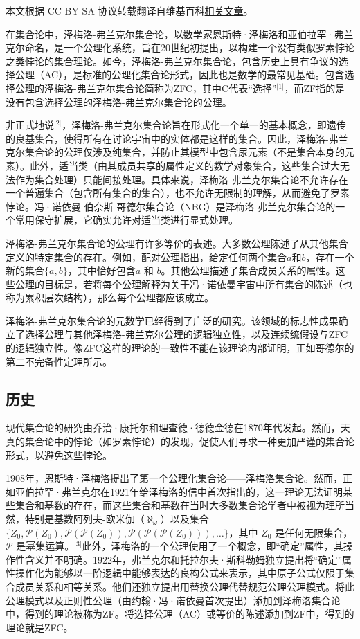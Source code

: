 
本文根据 CC-BY-SA 协议转载翻译自维基百科\href{https://en.wikipedia.org/wiki/Zermelo\%E2\%80\%93Fraenkel_set_theory}{相关文章}。

在集合论中，泽梅洛-弗兰克尔集合论，以数学家恩斯特·泽梅洛和亚伯拉罕·弗兰克尔命名，是一个公理化系统，旨在20世纪初提出，以构建一个没有类似罗素悖论之类悖论的集合理论。如今，泽梅洛-弗兰克尔集合论，包含历史上具有争议的选择公理（AC），是标准的公理化集合论形式，因此也是数学的最常见基础。包含选择公理的泽梅洛-弗兰克尔集合论简称为ZFC，其中C代表“选择”\(^\text{[1]}\)，而ZF指的是没有包含选择公理的泽梅洛-弗兰克尔集合论的公理。

非正式地说\(^\text{[2]}\)，泽梅洛-弗兰克尔集合论旨在形式化一个单一的基本概念，即遗传的良基集合，使得所有在讨论宇宙中的实体都是这样的集合。因此，泽梅洛-弗兰克尔集合论的公理仅涉及纯集合，并防止其模型中包含尿元素（不是集合本身的元素）。此外，适当类（由其成员共享的属性定义的数学对象集合，这些集合过大无法作为集合处理）只能间接处理。具体来说，泽梅洛-弗兰克尔集合论不允许存在一个普遍集合（包含所有集合的集合），也不允许无限制的理解，从而避免了罗素悖论。冯·诺依曼-伯奈斯-哥德尔集合论（NBG）是泽梅洛-弗兰克尔集合论的一个常用保守扩展，它确实允许对适当类进行显式处理。

泽梅洛-弗兰克尔集合论的公理有许多等价的表述。大多数公理陈述了从其他集合定义的特定集合的存在。例如，配对公理指出，给定任何两个集合\(a\)和\(b\)，存在一个新的集合\(\{a,b\}\)，其中恰好包含\(a\) 和 \(b\)。其他公理描述了集合成员关系的属性。这些公理的目标是，若将每个公理解释为关于冯·诺依曼宇宙中所有集合的陈述（也称为累积层次结构），那么每个公理都应该成立。

泽梅洛-弗兰克尔集合论的元数学已经得到了广泛的研究。该领域的标志性成果确立了选择公理与其他泽梅洛-弗兰克尔公理的逻辑独立性，以及连续统假设与ZFC的逻辑独立性。像ZFC这样的理论的一致性不能在该理论内部证明，正如哥德尔的第二不完备性定理所示。
\subsection{历史}
现代集合论的研究由乔治·康托尔和理查德·德德金德在1870年代发起。然而，天真的集合论中的悖论（如罗素悖论）的发现，促使人们寻求一种更加严谨的集合论形式，以避免这些悖论。

1908年，恩斯特·泽梅洛提出了第一个公理化集合论——泽梅洛集合论。然而，正如亚伯拉罕·弗兰克尔在1921年给泽梅洛的信中首次指出的，这一理论无法证明某些集合和基数的存在，而这些集合和基数在当时大多数集合论学者中被视为理所当然，特别是基数阿列夫-欧米伽（\(\aleph_\omega\)）以及集合 \(\{Z_0, \mathcal{P}(Z_0), \mathcal{P}(\mathcal{P}(Z_0)), \mathcal{P}(\mathcal{P}(\mathcal{P}(Z_0))), \dots\}\)，其中 \(Z_0\) 是任何无限集合，\(\mathcal{P}\) 是幂集运算。\(^\text{[3]}\)此外，泽梅洛的一个公理使用了一个概念，即“确定”属性，其操作性含义并不明确。1922年，弗兰克尔和托拉尔夫·斯科勒姆独立提出将“确定”属性操作化为能够以一阶逻辑中能够表达的良构公式来表示，其中原子公式仅限于集合成员关系和相等关系。他们还独立提出用替换公理代替规范公理公理模式。将此公理模式以及正则性公理（由约翰·冯·诺依曼首次提出）添加到泽梅洛集合论中，得到的理论被称为ZF。将选择公理（AC）或等价的陈述添加到ZF中，得到的理论就是ZFC。

